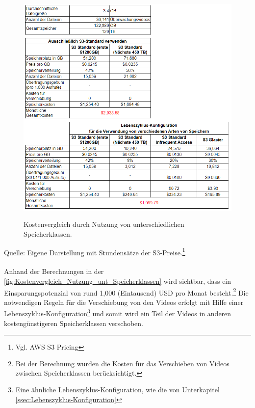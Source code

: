 \begin{figure}[h!]
  \centering
  \includegraphics[scale=0.7]{sources/Kostenvergleich_Nutzung_unt_Speicherklassen}
  \caption[Kostenvergleich durch Nutzung von unterschiedlichen Speicherklassen]{}\label{fig:Kostenvergleich_Nutzung_unt_Speicherklassen} 
  Kostenvergleich durch Nutzung von unterschiedlichen Speicherklassen.  
\end{figure}
Quelle: Eigene Darstellung mit Stundensätze der S3-Preise.\footnote{Vgl. AWS S3 Pricing\cite{AMZ09}}
\\\\
Anhand der Berechnungen in der \autoref{fig:Kostenvergleich_Nutzung_unt_Speicherklassen} wird sichtbar, dass ein Einsparungspotenzial von rund 1,000 (Eintausend) USD pro Monat besteht.\footnote{Bei der Berechnung wurden die Kosten für das Verschieben von Videos zwischen Speicherklassen berücksichtigt.} Die notwendigen Regeln für die Verschiebung von den Videos erfolgt mit Hilfe einer Lebenszyklus-Konfiguration\footnote{Eine ähnliche Lebenszyklus-Konfiguration, wie die von Unterkapitel \ref{ssec:Lebenszyklus-Konfiguration}} und somit wird ein Teil der Videos in anderen kostengünstigeren Speicherklassen verschoben.
\newpage
